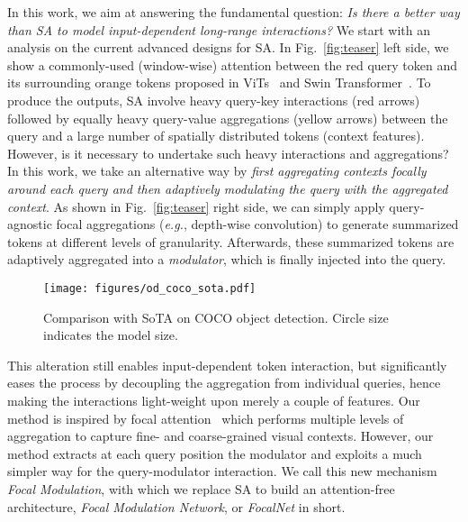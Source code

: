 \documentclass{article}
\begin{document}
In this work, we aim at answering the fundamental question: \textit{Is there a better way than SA to model input-dependent long-range interactions?} We start with an analysis on the current advanced designs for SA. In Fig.~\ref{fig:teaser} left side, we show a commonly-used (window-wise) attention between the red query token and its surrounding orange tokens proposed in ViTs~\cite{dosovitskiy2020image} and Swin Transformer~\cite{liu2021swin}. To produce the outputs, SA involve heavy query-key interactions (red arrows) followed by equally heavy query-value aggregations (yellow arrows) between the query and a large number of spatially distributed tokens (context features). However, {is it necessary to undertake such heavy interactions and aggregations?} In this work, we take an alternative way by \emph{first aggregating contexts focally around each query and then adaptively modulating the query with the aggregated context}. As shown in Fig.~\ref{fig:teaser} right side, we can simply apply query-agnostic focal aggregations (\textit{e.g.}, depth-wise convolution) to generate summarized tokens at different levels of granularity. Afterwards, these summarized tokens are adaptively aggregated into a \textit{modulator}, which is finally injected into the query. 
\begin{wrapfigure}{r}{0.45\textwidth}
  \begin{center}
  \vspace{-7mm}
   \hspace{-10mm}
    \texttt{[image: figures/od\_coco\_sota.pdf]}
  \end{center}
    \vspace{-4mm}
    \captionsetup{font=footnotesize}    
    \caption{Comparison with SoTA on COCO object detection. Circle size indicates the model size. }
    \vspace{-4mm}
    \label{fig:coco_sota}
\end{wrapfigure}
This alteration still enables input-dependent token interaction, but significantly eases the process by decoupling the aggregation from individual queries, hence making the interactions light-weight upon merely a couple of features. Our method is inspired by focal attention~\cite{yang2021focal} which performs multiple levels of aggregation to capture fine- and coarse-grained visual contexts. However, our method extracts at each query position the modulator and exploits a much simpler way for the query-modulator interaction. We call this new mechanism \textit{Focal Modulation}, with which we replace SA to build an attention-free architecture, \textit{Focal Modulation Network}, or \emph{FocalNet} in short.
\end{document}
